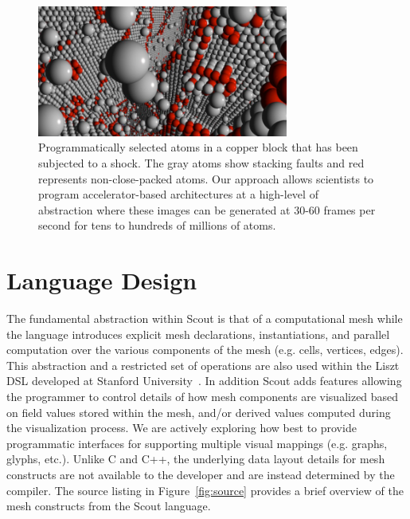\documentclass{tcvg}
\begin{document}
 	\begin{figure}[b!]
	  \centering
	  \includegraphics[width=3.25in]{figures/spasm.png}
	  \caption{Programmatically selected atoms in a copper block
         that has been subjected to a shock.  The gray atoms 
         show stacking faults and red represents non-close-packed 
         atoms.  Our approach allows scientists to program accelerator-based
         architectures at a high-level of abstraction where these images can 
         be generated at 30-60 frames per second for tens to hundreds of 
         millions of atoms.}
	  \label{fig:spasm}
	\end{figure}

  \section*{Language Design}

    The fundamental abstraction within Scout is that of a computational mesh
    while the language introduces explicit mesh declarations, instantiations,
    and parallel computation over the various components of the mesh (e.g. cells, 
    vertices, edges).  This abstraction and a restricted set of operations are
    also used within the Liszt DSL developed at Stanford 
    University~\cite{DeVito:2011:LDS}.  In addition Scout
    adds features allowing the programmer to control details of how  
    mesh components are visualized based on field values stored within the mesh, and/or 
    derived values computed during the visualization process. We are actively 
    exploring how best to provide programmatic interfaces for supporting multiple 
    visual mappings (e.g. graphs, glyphs, etc.). Unlike C and C++, the underlying 
    data layout details for mesh constructs are not available to the developer 
    and are instead determined by the compiler. The source listing in 
    Figure~\ref{fig:source} provides a brief overview of the mesh constructs 
    from the Scout language. 
     
\end{document}

